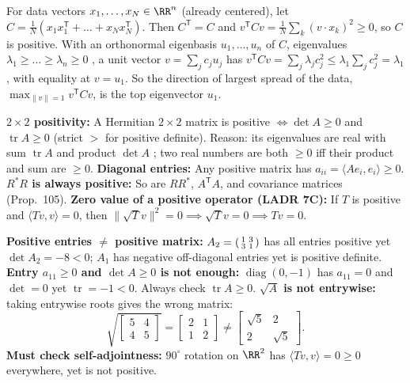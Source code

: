 \documentclass[10pt]{scrartcl}
\DeclareMathOperator{\tr}{tr}\DeclareMathOperator{\nul}{null}\DeclareMathOperator{\range}{range}\DeclareMathOperator{\spn}{span}
\begin{document}
\begin{example*}
  For data vectors $x_1,\dots,x_N\in\RR^n$ (already centered), let $C=\frac1N(x_1x_1^{\mathsf T}+\dots+x_Nx_N^{\mathsf T})$. Then $C^{\mathsf T}=C$ and $v^{\mathsf T}Cv=\frac1N\sum_k(v\cdot x_k)^2\ge0$, so $C$ is positive. With an orthonormal eigenbasis $u_1,\dots,u_n$ of $C$, eigenvalues $\lambda_1\ge\dots\ge\lambda_n\ge0$ , a unit vector $v=\sum_jc_ju_j$ has $v^{\mathsf T}Cv=\sum_j\lambda_jc_j^2\le\lambda_1\sum_jc_j^2=\lambda_1$, with equality at $v=u_1$. So the direction of largest spread of the data, $\max_{\|v\|=1}v^{\mathsf T}Cv$, is the top eigenvector $u_1$.
\end{example*}

\begin{shortcuts}
  \ii \textbf{$2\times2$ positivity:} A Hermitian $2\times2$ matrix is positive $\iff \det A\ge0$ and $\tr A\ge0$ (strict $>$ for positive definite). Reason: its eigenvalues are real with sum $\tr A$ and product $\det A$ ; two real numbers are both $\ge0$ iff their product and sum are $\ge0$.
  \ii \textbf{Diagonal entries:} Any positive matrix has $a_{ii}=\langle Ae_i,e_i\rangle\ge0$.
  \ii \textbf{$R^*R$ is always positive:} So are $RR^*$, $A^{\mathsf T}A$, and covariance matrices (Prop.~105).
  \ii \textbf{Zero value of a positive operator (LADR 7C):} If $T$ is positive and $\langle Tv,v\rangle=0$, then $\|\sqrt{T}v\|^2=0 \implies \sqrt{T}v=0 \implies Tv=0$.
\end{shortcuts}

\begin{trapbox}
  \ii \textbf{Positive entries $\neq$ positive matrix:} $A_2=\begin{psmallmatrix}1&3\\3&1\end{psmallmatrix}$ has all entries positive yet $\det A_2=-8<0$; $A_1$ has negative off-diagonal entries yet is positive definite.
  \ii \textbf{Entry $a_{11}\ge0$ and $\det A\ge0$ is not enough:} $\operatorname{diag}(0,-1)$ has $a_{11}=0$ and $\det=0$ yet $\tr=-1<0$. Always check $\tr A\ge0$.
  \ii \textbf{$\sqrt{A}$ is not entrywise:} taking entrywise roots gives the wrong matrix:
  \[
    \sqrt{\begin{bmatrix}5&4\\4&5\end{bmatrix}} = \begin{bmatrix}2&1\\1&2\end{bmatrix} \neq \begin{bmatrix}\sqrt{5}&2\\2&\sqrt{5}\end{bmatrix}.
  \]
  \ii \textbf{Must check self-adjointness:} $90^\circ$ rotation on $\RR^2$ has $\langle Tv,v\rangle=0\ge0$ everywhere, yet is not positive.
\end{trapbox}
\end{document}
